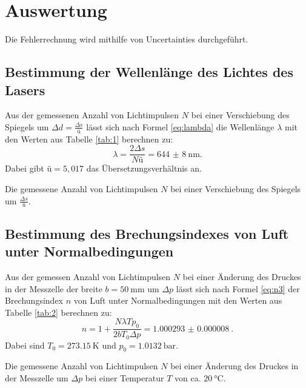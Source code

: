 \section{Auswertung}
\label{sec:Auswertung}

Die Fehlerrechnung wird mithilfe von Uncertainties \cite{uncertainties} durchgeführt.

\subsection{Bestimmung der Wellenlänge des Lichtes des Lasers}

Aus der gemessenen Anzahl von Lichtimpulsen $N$ bei einer Verschiebung des Spiegels um $\Delta d=\frac{\Delta s}{ü}$ lässt sich nach Formel \eqref{eq:lambda} die Wellenlänge $\lambda$ mit den Werten aus Tabelle \ref{tab:1} berechnen zu:
\[
	\lambda = \frac{2\Delta s}{N ü}=\SI{644(8)}{\nano\meter}\text{.}
\]
Dabei gibt $ü=5,017$ das Übersetzungsverhältnis an.

\begin{table}
	\centering
	\caption{Die gemessene Anzahl von Lichtimpulsen $N$ bei einer Verschiebung des Spiegels um $\frac{\Delta s}{ü}$.}
	
	\label{tab:1}
\end{table}

\subsection{Bestimmung des Brechungsindexes von Luft unter Normalbedingungen}

Aus der gemessen Anzahl von Lichtimpulsen $N$ bei einer Änderung des Druckes in der Messzelle der breite $b=\SI{50}{\milli\meter}$ um $\Delta p$ lässt sich nach Formel \eqref{eq:n3} der Brechungsindex $n$ von Luft unter Normalbedingungen mit den Werten aus Tabelle \ref{tab:2} berechnen zu:
\[
	n = 1+ \frac{N \lambda T p_0}{2 b T_0 \Delta p} = \SI{1.000293(8)}{}\text{.}
\]
Dabei sind $T_0=\SI{273,15}{\kelvin}$ und $p_0=\SI{1,0132}{\bar}$. 

\begin{table}
	\centering
	\caption{Die gemessene Anzahl von Lichtimpulsen $N$ bei einer Änderung des Druckes in der Messzelle um $\Delta p$ bei einer Temperatur $T$ von ca. $\SI{20}{\degreeCelsius}$.}
	
	\label{tab:2}
\end{table}